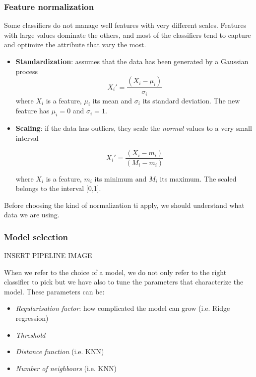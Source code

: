 \subsubsection*{Feature normalization}

Some classifiers do not manage well features with very different scales. Features with large values dominate the others, and most of the classifiers tend to capture and optimize the attribute that vary the most.

\begin{itemize}
\item \textbf{Standardization}: assumes that the data has been generated by a Gaussian process 
$$X_i' = \frac{(X_i - \mu_i)}{\sigma_i}$$
where $X_i$ is a feature, $\mu_i$ its mean and $\sigma_i$ its standard deviation. The new feature has $\mu_i = 0$ and $\sigma_i = 1$.

\item \textbf{Scaling}: if the data has outliers, they scale the \emph{normal} values to a very small interval

$$X_i' = \frac{(X_i - m_i)}{(M_i - m_i)}$$

where $X_i$ is a feature, $m_i$ its minimum and $M_i$ its maximum. The scaled belongs to the interval [0,1].

\end{itemize}

Before choosing the kind of normalization ti apply, we should understand what data we are using.

\subsubsection{Model selection}

INSERT PIPELINE IMAGE

When we refer to the choice of a model, we do not only refer to the right classifier to pick but we have also to tune the parameters that characterize the model. These parameters can be:
\begin{itemize}
\item \emph{Regularisation factor}: how complicated the model can grow (i.e. Ridge regression)
\item \emph{Threshold} 
\item \emph{Distance function} (i.e. KNN)
\item \emph{Number of neighbours} (i.e. KNN)
\end{itemize}

